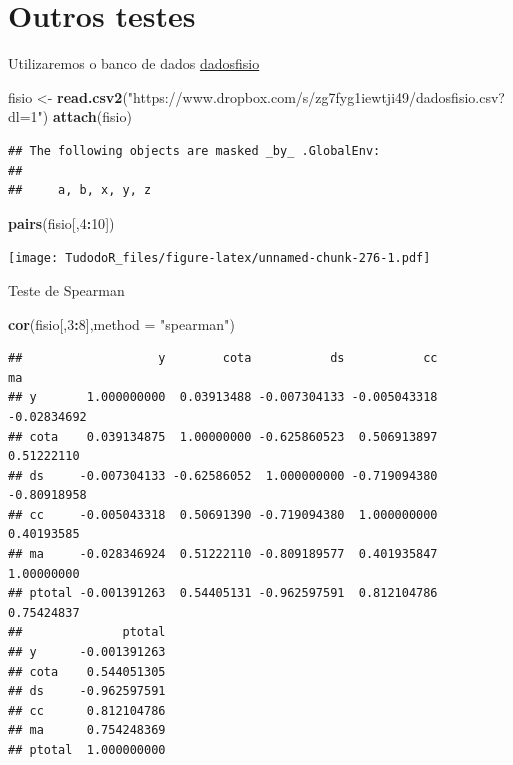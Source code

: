 \documentclass[
]{book}
\newenvironment{Shaded}{\begin{snugshade}}{\end{snugshade}}
\newcommand{\DataTypeTok}[1]{\textcolor[rgb]{0.13,0.29,0.53}{#1}}
\newcommand{\DecValTok}[1]{\textcolor[rgb]{0.00,0.00,0.81}{#1}}
\newcommand{\KeywordTok}[1]{\textcolor[rgb]{0.13,0.29,0.53}{\textbf{#1}}}
\newcommand{\NormalTok}[1]{#1}
\newcommand{\OperatorTok}[1]{\textcolor[rgb]{0.81,0.36,0.00}{\textbf{#1}}}
\newcommand{\StringTok}[1]{\textcolor[rgb]{0.31,0.60,0.02}{#1}}
\begin{document}
\hypertarget{outros-testes}{%
\section{Outros testes}\label{outros-testes}}

Utilizaremos o banco de dados \href{https://www.dropbox.com/s/zg7fyg1iewtji49/dadosfisio.csv?dl=0}{dadosfisio}

\begin{Shaded}
\begin{Highlighting}[]
\NormalTok{fisio <-}\StringTok{ }\KeywordTok{read.csv2}\NormalTok{(}\StringTok{"https://www.dropbox.com/s/zg7fyg1iewtji49/dadosfisio.csv?dl=1"}\NormalTok{)}
\KeywordTok{attach}\NormalTok{(fisio)}
\end{Highlighting}
\end{Shaded}

\begin{verbatim}
## The following objects are masked _by_ .GlobalEnv:
## 
##     a, b, x, y, z
\end{verbatim}

\begin{Shaded}
\begin{Highlighting}[]
\KeywordTok{pairs}\NormalTok{(fisio[,}\DecValTok{4}\OperatorTok{:}\DecValTok{10}\NormalTok{])}
\end{Highlighting}
\end{Shaded}

\texttt{[image: TudodoR\_files/figure-latex/unnamed-chunk-276-1.pdf]}

Teste de Spearman

\begin{Shaded}
\begin{Highlighting}[]
\KeywordTok{cor}\NormalTok{(fisio[,}\DecValTok{3}\OperatorTok{:}\DecValTok{8}\NormalTok{],}\DataTypeTok{method =} \StringTok{"spearman"}\NormalTok{)}
\end{Highlighting}
\end{Shaded}

\begin{verbatim}
##                   y        cota           ds           cc          ma
## y       1.000000000  0.03913488 -0.007304133 -0.005043318 -0.02834692
## cota    0.039134875  1.00000000 -0.625860523  0.506913897  0.51222110
## ds     -0.007304133 -0.62586052  1.000000000 -0.719094380 -0.80918958
## cc     -0.005043318  0.50691390 -0.719094380  1.000000000  0.40193585
## ma     -0.028346924  0.51222110 -0.809189577  0.401935847  1.00000000
## ptotal -0.001391263  0.54405131 -0.962597591  0.812104786  0.75424837
##              ptotal
## y      -0.001391263
## cota    0.544051305
## ds     -0.962597591
## cc      0.812104786
## ma      0.754248369
## ptotal  1.000000000
\end{verbatim}
\end{document}
